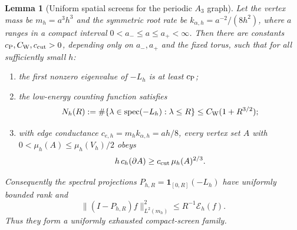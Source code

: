 \documentclass[11pt]{article}
\numberwithin{equation}{section}
\newtheorem{lemma}[lemma]{Lemma}
\theoremstyle{definition}
\theoremstyle{remark}
\newcommand{\one}{\mathbf 1}
\newcommand{\spec}{\operatorname{spec}}
\newcommand{\norm}[1]{\lVert#1\rVert}
\begin{document}
\begin{lemma}[Uniform spatial screens for the periodic $A_3$ graph]
\label{lem:supp-periodic-screens}
Let the vertex mass be $m_h=a^3h^3$ and the symmetric root rate be
$k_{\alpha,h}=a^{-2}/(8h^2)$, where $a$ ranges in a compact interval
$0<a_-\le a\le a_+<\infty$.  Then there are constants
$c_{\rm P},C_{\rm W},c_{\rm cut}>0$, depending only on
$a_-,a_+$ and the fixed torus, such that for all sufficiently small $h$:
\begin{enumerate}[label=\textup{(\roman*)},leftmargin=2.8em]
\item the first nonzero eigenvalue of $-L_h$ is at least $c_{\rm P}$;
\item the low-energy counting function satisfies
      \begin{equation}
       N_h(R):=\#\{\lambda\in\spec(-L_h):\lambda\le R\}
       \le C_{\rm W}(1+R^{3/2});
       \label{eq:supp-weyl-count}
      \end{equation}
\item with edge conductance
      $c_{e,h}=m_hk_{\alpha,h}=ah/8$, every vertex set $A$ with
      $0<\mu_h(A)\le\mu_h(V_h)/2$ obeys
      \begin{equation}
       h\,c_h(\partial A)
       \ge c_{\rm cut}\,\mu_h(A)^{2/3}.
       \label{eq:supp-periodic-cut}
      \end{equation}
\end{enumerate}
Consequently the spectral projections
$P_{h,R}=\one_{[0,R]}(-L_h)$ have uniformly bounded rank and
\begin{equation}
 \norm{(I-P_{h,R})f}_{L^2(m_h)}^2
 \le R^{-1}\mathcal E_h(f).
 \label{eq:supp-screen-tail}
\end{equation}
Thus they form a uniformly exhausted compact-screen family.
\end{lemma}
\end{document}

